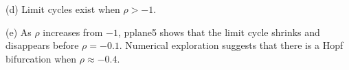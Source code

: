 \documentclass{ximera}
\begin{document}
\begin{computerExercise}
\begin{solution}
(d) Limit cycles exist when $\rho>-1$.

(e)  As $\rho$ increases from $-1$, {\sf pplane5} shows that the limit 
cycle shrinks and disappears before $\rho=-0.1$. Numerical exploration
suggests that there is a Hopf bifurcation when $\rho\approx -0.4$.

\begin{figure}[htb]
                       \centerline{%
                       }
\end{figure}


\end{solution}
\end{computerExercise}
\end{document}
